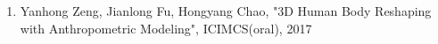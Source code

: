\begin{enumerate}
    \item Yanhong Zeng, Jianlong Fu, Hongyang Chao, "3D Human Body Reshaping with Anthropometric Modeling", ICIMCS(oral), 2017 
\end{enumerate}